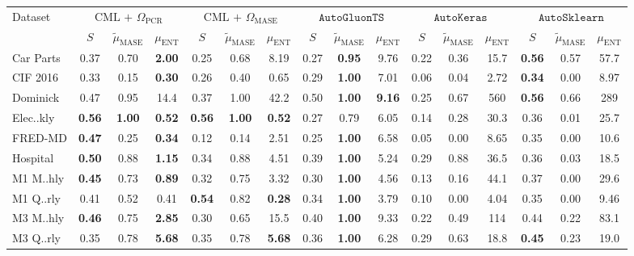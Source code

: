 
    \begin{tabular}{l|ccc|ccc|ccc|ccc|ccc}
        \toprule 
        Dataset & \multicolumn{3}{c}{$\text{CML + } \Omega_\text{PCR}$} & \multicolumn{3}{c}{$\text{CML + } \Omega_\text{MASE}$} & \multicolumn{3}{c}{$\texttt{AutoGluonTS}$} & \multicolumn{3}{c}{$\texttt{AutoKeras}$} & \multicolumn{3}{c}{$\texttt{AutoSklearn}$} \\
          & $S$ & $\tilde{\mu}_{\text{MASE}}$ & $\mu_{\text{ENT}}$ & $S$ & $\tilde{\mu}_{\text{MASE}}$ & $\mu_{\text{ENT}}$ & $S$ & $\tilde{\mu}_{\text{MASE}}$ & $\mu_{\text{ENT}}$ & $S$ & $\tilde{\mu}_{\text{MASE}}$ & $\mu_{\text{ENT}}$ & $S$ & $\tilde{\mu}_{\text{MASE}}$ & $\mu_{\text{ENT}}$ \\
        \midrule
        Car Parts & 0.37 & 0.70 & \textbf{2.00} & 0.25 & 0.68 & 8.19 & 0.27 & \textbf{0.95} & 9.76 & 0.22 & 0.36 & 15.7 & \textbf{0.56} & 0.57 & 57.7 \\
        CIF 2016 & 0.33 & 0.15 & \textbf{0.30} & 0.26 & 0.40 & 0.65 & 0.29 & \textbf{1.00} & 7.01 & 0.06 & 0.04 & 2.72 & \textbf{0.34} & 0.00 & 8.97 \\
        Dominick & 0.47 & 0.95 & 14.4 & 0.37 & 1.00 & 42.2 & 0.50 & \textbf{1.00} & \textbf{9.16} & 0.25 & 0.67 & 560 & \textbf{0.56} & 0.66 & 289 \\
        Elec..kly & \textbf{0.56} & \textbf{1.00} & \textbf{0.52} & \textbf{0.56} & \textbf{1.00} & \textbf{0.52} & 0.27 & 0.79 & 6.05 & 0.14 & 0.28 & 30.3 & 0.36 & 0.01 & 25.7 \\
        FRED-MD & \textbf{0.47} & 0.25 & \textbf{0.34} & 0.12 & 0.14 & 2.51 & 0.25 & \textbf{1.00} & 6.58 & 0.05 & 0.00 & 8.65 & 0.35 & 0.00 & 10.6 \\
        Hospital & \textbf{0.50} & 0.88 & \textbf{1.15} & 0.34 & 0.88 & 4.51 & 0.39 & \textbf{1.00} & 5.24 & 0.29 & 0.88 & 36.5 & 0.36 & 0.03 & 18.5 \\
        M1 M..hly & \textbf{0.45} & 0.73 & \textbf{0.89} & 0.32 & 0.75 & 3.32 & 0.30 & \textbf{1.00} & 4.56 & 0.13 & 0.16 & 44.1 & 0.37 & 0.00 & 29.6 \\
        M1 Q..rly & 0.41 & 0.52 & 0.41 & \textbf{0.54} & 0.82 & \textbf{0.28} & 0.34 & \textbf{1.00} & 3.79 & 0.10 & 0.00 & 4.04 & 0.35 & 0.00 & 9.46 \\
        M3 M..hly & \textbf{0.46} & 0.75 & \textbf{2.85} & 0.30 & 0.65 & 15.5 & 0.40 & \textbf{1.00} & 9.33 & 0.22 & 0.49 & 114 & 0.44 & 0.22 & 83.1 \\
        M3 Q..rly & 0.35 & 0.78 & \textbf{5.68} & 0.35 & 0.78 & \textbf{5.68} & 0.36 & \textbf{1.00} & 6.28 & 0.29 & 0.63 & 18.8 & \textbf{0.45} & 0.23 & 19.0 \\

\end{tabular}
